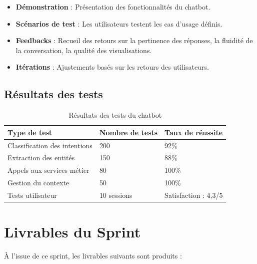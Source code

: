 \begin{itemize}
    \item \textbf{Démonstration} : Présentation des fonctionnalités du chatbot.
    \item \textbf{Scénarios de test} : Les utilisateurs testent les cas d'usage définis.
    \item \textbf{Feedbacks} : Recueil des retours sur la pertinence des réponses, la fluidité de la conversation, la qualité des visualisations.
    \item \textbf{Itérations} : Ajustements basés sur les retours des utilisateurs.
\end{itemize}

\subsection{Résultats des tests}

\begin{table}[H]
\centering
\begin{tabular}{|p{5cm}|p{4cm}|p{4cm}|}
\hline
\textbf{Type de test} & \textbf{Nombre de tests} & \textbf{Taux de réussite} \\
\hline
Classification des intentions & 200 & 92\% \\
\hline
Extraction des entités & 150 & 88\% \\
\hline
Appels aux services métier & 80 & 100\% \\
\hline
Gestion du contexte & 50 & 100\% \\
\hline
Tests utilisateur & 10 sessions & Satisfaction : 4,3/5 \\
\hline
\end{tabular}
\caption{Résultats des tests du chatbot}
\label{tab:chatbot-tests}
\end{table}

\section{Livrables du Sprint}
\label{sec:sprint6-livrables}

À l'issue de ce sprint, les livrables suivants sont produits :

